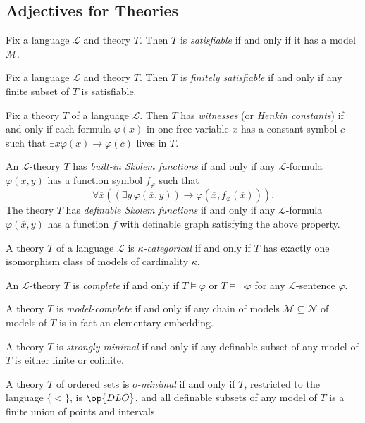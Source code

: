 \documentclass{article}
\begin{document}
\subsection{Adjectives for Theories}
\begin{definition}[satisfiable]
	Fix a language $\mathcal L$ and theory $T$. Then $T$ is \textit{satisfiable} if and only if it has a model $\mathcal M$.
\end{definition}
\begin{definition}
	Fix a language $\mathcal L$ and theory $T$. Then $T$ is \textit{finitely satisfiable} if and only if any finite subset of $T$ is satisfiable.
\end{definition}
\begin{definition}[witness]
	Fix a theory $T$ of a language $\mathcal L$. Then $T$ has \textit{witnesses} (or \textit{Henkin constants}) if and only if each formula $\varphi(x)$ in one free variable $x$ has a constant symbol $c$ such that $\exists x\varphi(x)\to\varphi(c)$ lives in $T$.
\end{definition}
\begin{definition}
	An $\mathcal L$-theory $T$ has \textit{built-in Skolem functions} if and only if any $\mathcal L$-formula $\varphi(\overline x,y)$ has a function symbol $f_\varphi$ such that
	\[\forall\overline x((\exists y\,\varphi(\overline x,y))\to\varphi(\overline x,f_\varphi(\overline x))).\]
	The theory $T$ has \textit{definable Skolem functions} if and only if any $\mathcal L$-formula $\varphi(\overline x,y)$ has a function $f$ with definable graph satisfying the above property.
\end{definition}
\begin{defihelper} 
	A theory $T$ of a language $\mathcal L$ is \textit{$\kappa$-categorical} if and only if $T$ has exactly one isomorphism class of models of cardinality $\kappa$.
\end{defihelper}
\begin{definition}[complete]
	An $\mathcal L$-theory $T$ is \textit{complete} if and only if $T\models\varphi$ or $T\models\lnot\varphi$ for any $\mathcal L$-sentence $\varphi$.
\end{definition}
\begin{definition}
	A theory $T$ is \textit{model-complete} if and only if any chain of models $\mathcal M\subseteq\mathcal N$ of models of $T$ is in fact an elementary embedding.
\end{definition}
\begin{definition}
	A theory $T$ is \textit{strongly minimal} if and only if any definable subset of any model of $T$ is either finite or cofinite.
\end{definition}
\begin{definition}[$o$-minimal]
	A theory $T$ of ordered sets is \textit{$o$-minimal} if and only if $T$, restricted to the language $\{<\}$, is $\op{DLO}$, and all definable subsets of any model of $T$ is a finite union of points and intervals.
\end{definition}
\end{document}
